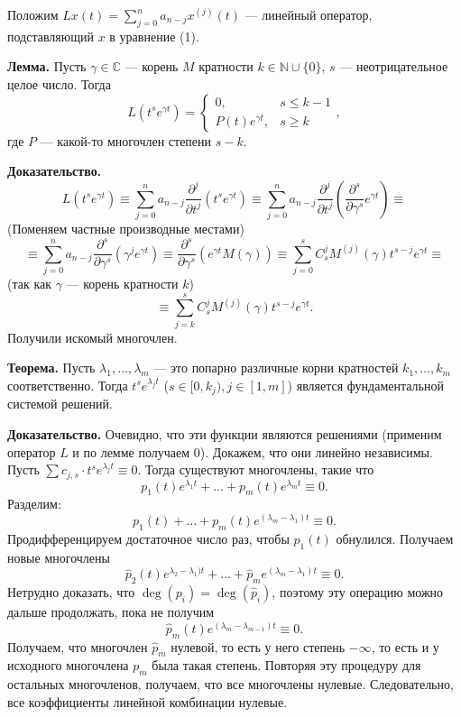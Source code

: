 Положим $Lx(t) = \sum_{j=0}^{n} a_{n-j} x^{(j)} (t)$ --- линейный оператор, подставляющий $x$ в уравнение (1).

\textbf{Лемма.} Пусть $\gamma \in \mathbb C$ --- корень $M$ кратности $k \in \mathbb N \cup \{0\}$, $s$ --- неотрицательное целое число.
Тогда
\[
    L(t^s e^{\gamma t}) =
    \begin{cases}
        0, & s \le k - 1 \\
        P(t) e^{\gamma t}, & s \ge k
    \end{cases} ,
\]
где $P$ --- какой-то многочлен степени $s - k$.

\textbf{Доказательство.}
\[
    L(t^s e^{\gamma t}) \equiv \sum_{j=0}^{n} a_{n-j} \frac{\partial^j}{\partial t^j} (t^s e^{\gamma t}) \equiv \sum_{j=0}^{n} a_{n-j} \frac{\partial^j}{\partial t^j} \left( \frac{\partial^s}{\partial \gamma^s} e^{\gamma t} \right) \equiv
\]
(Поменяем частные производные местами)
\[
    \equiv \sum_{j=0}^{n} a_{n-j} \frac{\partial^s}{\partial \gamma^s} (\gamma^j e^{\gamma t}) \equiv \frac{\partial^s}{\partial \gamma^s} (e^{\gamma t} M(\gamma)) \equiv \sum_{j=0}^{s} C_s^j M^{(j)}(\gamma) t^{s-j} e^{\gamma t} \equiv
\]
(так как $\gamma$ --- корень кратности $k$)
\[
    \equiv \sum_{j=k}^{s} C_s^j M^{(j)}(\gamma) t^{s-j} e^{\gamma t}.
\]
Получили искомый многочлен.

\QED

\textbf{Теорема.} Пусть $\lambda_1, \dots, \lambda_m$ --- это попарно различные корни кратностей $k_1, \dots, k_m$ соответственно.
Тогда $t^s e^{\lambda_j t}$ ($s \in [0, k_j), j \in [1, m]$) является фундаментальной системой решений.

\textbf{Доказательство.} Очевидно, что эти функции являются решениями (применим оператор $L$ и по лемме получаем 0).
Докажем, что они линейно независимы.
Пусть $\sum c_{j,s} \cdot t^s e^{\lambda_j t} \equiv 0$.
Тогда существуют многочлены, такие что
\[
    p_1(t) e^{\lambda_1 t} + \dots + p_m(t) e^{\lambda_m t} \equiv 0.
\]
Разделим:
\[
    p_1(t) + \dots + p_m(t) e^{(\lambda_m - \lambda_1)t} \equiv 0.
\]
Продифференцируем достаточное число раз, чтобы $p_1(t)$ обнулился. Получаем новые многочлены
\[
    \widehat p_2(t) e^{\lambda_2 - \lambda_1)t} + \dots + \widehat p_m e^{(\lambda_m - \lambda_1)t} \equiv 0.
\]
Нетрудно доказать, что $\deg(p_i) = \deg(\widehat p_i)$, поэтому эту операцию можно дальше продолжать, пока не получим
\[
    \widehat p_m(t) e^{(\lambda_m - \lambda_{m-1})t} \equiv 0.
\]
Получаем, что многочлен $\widehat p_m$ нулевой, то есть у него степень $-\infty$, то есть и у исходного многочлена $p_m$ была такая степень.
Повторяя эту процедуру для остальных многочленов, получаем, что все многочлены нулевые.
Следовательно, все коэффициенты линейной комбинации нулевые.

